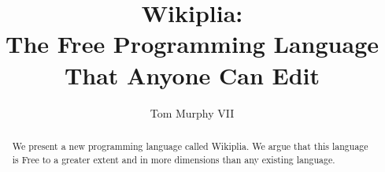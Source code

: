 \documentclass{article}
\begin{document}
\title{{\bf \huge Wikiplia}:\\
       The Free Programming Language\\
       That Anyone Can Edit}

\author{Tom Murphy VII}

\maketitle

\begin{abstract}
We present a new programming language called Wikiplia. We argue that
this language is Free to a greater extent and in more dimensions than
any existing language. 

\end{abstract}


\nocite{alice}


{\small


}
\end{document}
